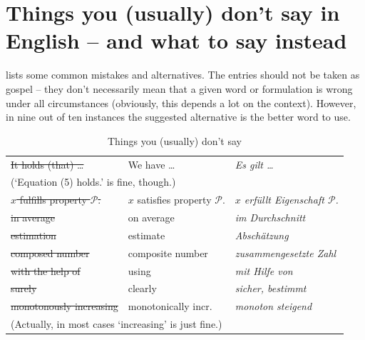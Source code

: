 \section[Things you (usually) don't say in English]%
{Things you (usually) don't say in English -- and what to say
  instead}
\label{sec:list}

 lists some common mistakes and
alternatives.  The entries should not be taken as gospel -- they don't
necessarily mean that a given word or formulation is wrong under all
circumstances (obviously, this depends a lot on the context). However,
in nine out of ten instances the suggested alternative is the better
word to use.

\begin{table}
  \centering
  \caption{Things you (usually) don't say}
  \label{tab:things-you-dont-say}
  \begin{tabular}{lll}
    \toprule
    \st{It holds (that) \dots} & We have \dots & \emph{Es gilt \dots}\\
    \multicolumn{3}{l}{\quad\footnotesize(`Equation (5) holds.' is fine, though.)}\\
    \st{$x$ fulfills property $\mathcal{P}$.}& \(x\) satisfies property \(\mathcal{P}\). & \emph{\(x\) erfüllt Eigenschaft \(\mathcal{P}\).} \\
    \st{in average} & on average & \emph{im Durchschnitt}\\
    \st{estimation} & estimate   & \emph{Abschätzung}\\
    \st{composed number} & composite number & \emph{zusammengesetzte Zahl}\\
    \st{with the help of} & using & \emph{mit Hilfe von}\\
    \st{surely} & clearly & \emph{sicher, bestimmt}\\
    \st{monotonously increasing} & monotonically incr. & \emph{monoton steigend}\\
    \multicolumn{3}{l}{\quad\footnotesize(Actually, in most cases `increasing' is just fine.)}\\
    \bottomrule
  \end{tabular}
\end{table}

